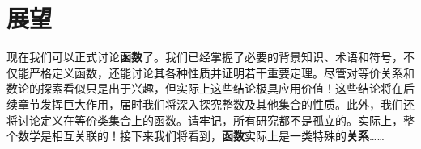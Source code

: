 \section{展望}

现在我们可以正式讨论\textbf{函数}了。我们已经掌握了必要的背景知识、术语和符号，不仅能严格定义函数，还能讨论其各种性质并证明若干重要定理。尽管对等价关系和数论的探索看似只是出于兴趣，但实际上这些结论极具应用价值！这些结论将在后续章节发挥巨大作用，届时我们将深入探究整数及其他集合的性质。此外，我们还将讨论定义在等价类集合上的函数。请牢记，所有研究都不是孤立的。实际上，整个数学是相互关联的！接下来我们将看到，\textbf{函数}实际上是一类特殊的\textbf{关系}……
